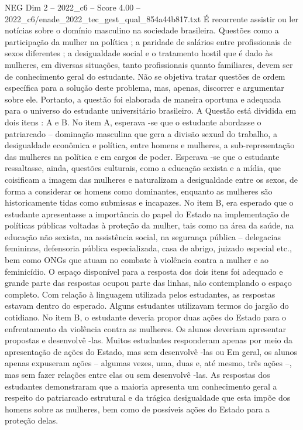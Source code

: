 \begin{textsample}{NEG Dim 2 – 2022\_c6 – Score 4.00 – 2022\_c6/enade\_2022\_tec\_gest\_qual\_854a44b817.txt}
É recorrente assistir ou ler notícias sobre o domínio masculino na sociedade brasileira.
Questões como a participação da mulher na política ; a paridade de salários entre profissionais de sexos diferentes ; a desigualdade social e o tratamento hostil que é dado às mulheres, em diversas situações, tanto profissionais quanto familiares, devem ser de conhecimento geral do estudante.
Não se objetiva tratar questões de ordem específica para a solução deste problema, mas, apenas, discorrer e argumentar sobre ele.
Portanto, a questão foi elaborada de maneira oportuna e adequada para o universo do estudante universitário brasileiro.
A Questão está dividida em dois itens : A e B.
No item A, esperava -se que o estudante abordasse o patriarcado – dominação masculina que gera a divisão sexual do trabalho, a desigualdade econômica e política, entre homens e mulheres, a sub-representação das mulheres na política e em cargos de poder.
Esperava -se que o estudante ressaltasse, ainda, questões culturais, como a educação sexista e a mídia, que coisificam a imagem das mulheres e naturalizam a desigualdade entre os sexos, de forma a considerar os homens como dominantes, enquanto as mulheres são historicamente tidas como submissas e incapazes.
No item B, era esperado que o estudante apresentasse a importância do papel do Estado na implementação de políticas públicas voltadas à proteção da mulher, tais como na área da saúde, na educação não sexista, na assistência social, na segurança pública – delegacias femininas, defensoria pública especializada, casa de abrigo, juizado especial etc., bem como ONGs que atuam no combate à violência contra a mulher e ao feminicídio.
O espaço disponível para a resposta dos dois itens foi adequado e grande parte das respostas ocupou parte das linhas, não contemplando o espaço completo.
Com relação à linguagem utilizada pelos estudantes, as respostas estavam dentro do esperado.
Alguns estudantes utilizavam termos do jargão do cotidiano.
No item B, o estudante deveria propor duas ações do Estado para o enfrentamento da violência contra as mulheres.
Os alunos deveriam apresentar propostas e desenvolvê -las.
Muitos estudantes responderam apenas por meio da apresentação de ações do Estado, mas sem desenvolvê -las ou Em geral, os alunos apenas expuseram ações – algumas vezes, uma, duas e, até mesmo, três ações –, mas sem fazer relações entre elas ou sem desenvolvê -las.
As respostas dos estudantes demonstraram que a maioria apresenta um conhecimento geral a respeito do patriarcado estrutural e da trágica desigualdade que esta impõe dos homens sobre as mulheres, bem como de possíveis ações do Estado para a proteção delas.

\end{textsample}
